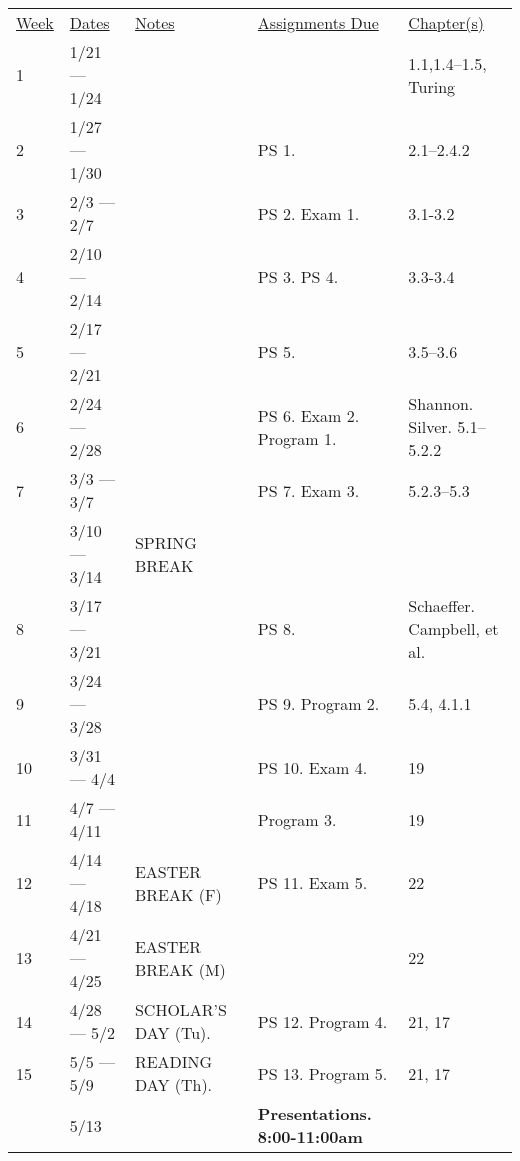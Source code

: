 \documentclass[10pt]{article}
\begin{document}
\begin{center}
  \begin{tabular}{lllp{2in}l}
  \underline{Week} & \underline{Dates} & \underline{Notes} & \underline{Assignments Due} & \underline{Chapter(s)}\\
  1 & 1/21 --- 1/24 & & &  1.1,1.4--1.5, Turing \\
  2 & 1/27 --- 1/30 &  & PS 1. & 2.1--2.4.2 \\
  3 & 2/3 --- 2/7 & &  PS 2. Exam 1. & 3.1-3.2 \\
  4 & 2/10 --- 2/14 &  & PS 3. PS 4. &  3.3-3.4\\
  5 & 2/17 --- 2/21 & & PS 5. & 3.5--3.6 \\
  6 & 2/24 --- 2/28 & & PS 6. Exam 2. Program 1.  &  Shannon. Silver. 5.1--5.2.2\\
  7 & 3/3 --- 3/7 &  & PS 7. Exam 3.  & 5.2.3--5.3 \\
   & 3/10 --- 3/14 & SPRING BREAK & &  \\
  8 & 3/17 --- 3/21 &  & PS 8.  & Schaeffer. Campbell, et al. \\
  9 & 3/24 --- 3/28 & & PS 9. Program 2. & 5.4, 4.1.1\\
  10 & 3/31 --- 4/4 & & PS 10. Exam 4. &  19 \\
  11 & 4/7 --- 4/11 &  & Program 3.  & 19 \\
  12 & 4/14 --- 4/18 & EASTER BREAK (F) & PS 11. Exam 5. & 22 \\
  13 & 4/21 --- 4/25 & EASTER BREAK (M) &  & 22  \\
  14 & 4/28 --- 5/2 & SCHOLAR'S DAY (Tu). & PS 12. Program 4. & 21, 17 \\
  15 & 5/5 --- 5/9 & READING DAY (Th). & PS 13. Program 5. & 21, 17 \\
   & 5/13 &   & \textbf{Presentations. 8:00-11:00am} & 
  \end{tabular}
  \end{center}
\end{document}

